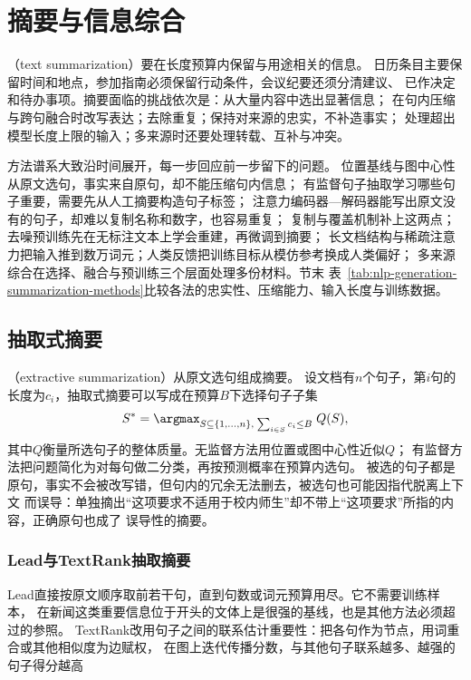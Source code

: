 \section{摘要与信息综合}
\label{sec:nlp-generation-summarization}

（text summarization）要在长度预算内保留与用途相关的信息。
日历条目主要保留时间和地点，参加指南必须保留行动条件，会议纪要还须分清建议、
已作决定和待办事项。摘要面临的挑战依次是：从大量内容中选出显著信息；
在句内压缩与跨句融合时改写表达；去除重复；保持对来源的忠实，不补造事实；
处理超出模型长度上限的输入；多来源时还要处理转载、互补与冲突。

方法谱系大致沿时间展开，每一步回应前一步留下的问题。
位置基线与图中心性从原文选句，事实来自原句，却不能压缩句内信息；
有监督句子抽取学习哪些句子重要，需要先从人工摘要构造句子标签；
注意力编码器—解码器能写出原文没有的句子，却难以复制名称和数字，也容易重复；
复制与覆盖机制补上这两点；去噪预训练先在无标注文本上学会重建，再微调到摘要；
长文档结构与稀疏注意力把输入推到数万词元；人类反馈把训练目标从模仿参考换成人类偏好；
多来源综合在选择、融合与预训练三个层面处理多份材料。节末
表~\ref{tab:nlp-generation-summarization-methods}比较各法的忠实性、压缩能力、输入长度与训练数据。

\subsection{抽取式摘要}
\label{sec:nlp-generation-extractive-summary}

（extractive summarization）从原文选句组成摘要。
设文档有$n$个句子，第$i$句的长度为$c_i$，抽取式摘要可以写成在预算$B$下选择句子子集
\begin{equation}
  S^{\ast}=\argmax_{S\subseteq\{1,\ldots,n\},\;\sum_{i\in S}c_i\leq B}\;
  Q(S),
  \label{eq:nlp-generation-extractive-objective}
\end{equation}
其中$Q$衡量所选句子的整体质量。无监督方法用位置或图中心性近似$Q$；
有监督方法把问题简化为对每句做二分类，再按预测概率在预算内选句。
被选的句子都是原句，事实不会被改写错，但句内的冗余无法删去，被选句也可能因指代脱离上下文
而误导：单独摘出“这项要求不适用于校内师生”却不带上“这项要求”所指的内容，正确原句也成了
误导性的摘要。

\subsubsection{Lead与TextRank抽取摘要}
\label{sec:nlp-generation-extractive}

Lead直接按原文顺序取前若干句，直到句数或词元预算用尽。它不需要训练样本，
在新闻这类重要信息位于开头的文体上是很强的基线，也是其他方法必须超过的参照。
TextRank改用句子之间的联系估计重要性：把各句作为节点，用词重合或其他相似度为边赋权，
在图上迭代传播分数，与其他句子联系越多、越强的句子得分越高

